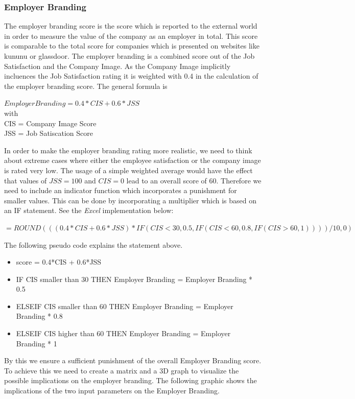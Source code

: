 \subsubsection{Employer Branding}
The employer branding score is the score which is reported to the external world in order to measure the value of the company as an employer in total. This score is comparable to the total score for companies which is presented on websites like kununu or glassdoor. The employer branding is a combined score out of the Job Satisfaction and the Company Image. As the Company Image implicitly incluences the Job Satisfaction rating it is weighted with 0.4 in the calculation of the employer branding score. The general formula is
\begin{center}
$Employer Branding = 0.4 * CIS + 0.6 * JSS$ \\
with \\
CIS = Company Image Score   \\
JSS = Job Satiscation Score
\end{center}

In order to make the employer branding rating more realistic, we need to think about extreme cases where either the employee satisfaction or the company image is rated very low. The usage of a simple weighted average would have the effect that values of $JSS = 100$ and $CIS = 0$ lead to an overall score of 60.
Therefore we need to include an indicator function which incorporates a punishment for smaller values.
This can be done by incorporating a multiplier which is based on an IF statement. See the \textit{Excel} implementation below:
\begin{center}
    $=ROUND(((0.4*CIS+0.6*JSS)*IF(CIS<30,0.5,IF(CIS<60,0.8,IF(CIS>60,1))))/10,0)$
\end{center}

The following pseudo code explains the statement above.

\begin{itemize}
    \item score = 0.4*CIS + 0.6*JSS
    \item IF CIS smaller than 30 THEN Employer Branding = Employer Branding * 0.5
    \item ELSEIF CIS smaller than 60 THEN Employer Branding = Employer Branding * 0.8
    \item ELSEIF CIS higher than 60 THEN Employer Branding = Employer Branding * 1
\end{itemize}

By this we ensure a sufficient punishment of the overall Employer Branding score. To achieve this we need to create a matrix and a 3D graph to visualize the possible implications on the employer branding. The following graphic shows the implications of the two input parameters on the Employer Branding.


